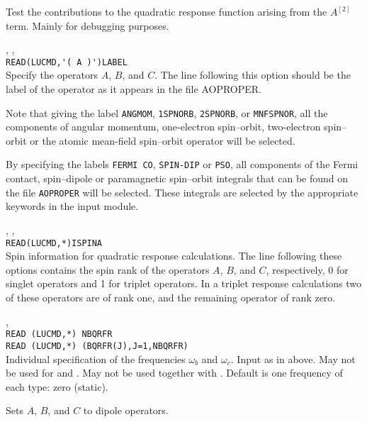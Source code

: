 \begin{description}

\item{}
Test the contributions to the quadratic response function arising from
the $A^{\left[2\right]}$ term. Mainly for debugging purposes.

\item{, , }\\
\verb|READ(LUCMD,'( A )')LABEL|\\
Specify the operators $A$, $B$, and $C$. The line following this
option should be the label of the operator as it appears in the file
AOPROPER.

Note that giving the label \verb|ANGMOM|, \verb|1SPNORB|,
\verb|2SPNORB|, or \verb|MNFSPNOR|, all the components of angular
momentum, one-electron spin--orbit, two-electron spin--orbit or the
atomic mean-field spin--orbit operator will be selected.

By specifying the labels \verb|FERMI CO|, \verb|SPIN-DIP| or
\verb|PSO|, all components of the Fermi contact, spin--dipole or
paramagnetic spin--orbit integrals that can be found on the file
\verb|AOPROPER| will be selected. These integrals are selected by the
appropriate keywords in the  input module.

\item{, , }\\
\verb|READ(LUCMD,*)ISPINA|\\
Spin information for quadratic response calculations.
The line following these options contains the spin
rank of the operators
$A$, $B$, and $C$, respectively, 0 for singlet operators and 1 for triplet
operators.
In a triplet response calculations two of these operators are of rank one,
and the remaining operator of rank zero.

\item{, }\\
\verb|READ (LUCMD,*) NBQRFR|\\
\verb|READ (LUCMD,*) (BQRFR(J),J=1,NBQRFR)|\\
Individual specification of the frequencies $\omega_b$ and $\omega_c$.
Input as in  above.
May not be used for  and .
May not be used together with .
Default is one frequency of each type: zero (static).

\item{}
Sets $A$, $B$, and $C$ to dipole operators.


\end{description}
